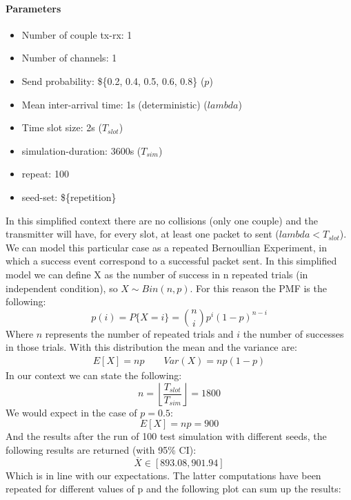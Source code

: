 \paragraph{Parameters}
\begin{itemize}
	\item Number of couple tx-rx: 1
	\item Number of channels: 1
	\item Send probability: \$\{0.2, 0.4, 0.5, 0.6, 0.8\} ($p$)
	\item Mean inter-arrival time: 1s (deterministic) ($lambda$)
	\item Time slot size: 2s ($T_{slot}$)
	\item simulation-duration: 3600s ($T_{sim}$)
	\item repeat: 100
	\item seed-set: \$\{repetition\}
\end{itemize}
In this simplified context there are no collisions (only one couple) and the transmitter will have, for every slot, at least one packet to sent ($lambda < T_{slot}$). We can model this particular case as a repeated Bernoullian Experiment, in which a success event correspond to a successful packet sent. In this simplified model we can define X as the number of success in n repeated trials (in independent condition), so $X \sim Bin(n, p)$. For this reason the PMF is the following:
\begin{equation}
	p(i) = P\{X = i\} = \binom{n}{i} p^{i} (1-p)^{n-i}
\end{equation}
Where $n$ represents the number of repeated trials and $i$ the number of successes in those trials. With this distribution the mean and the variance are:
\begin{align*}
	E[X] = np \qquad     
	Var(X) = np(1-p)
\end{align*}
In our context we can state the following:
\begin{equation}
	n = \left \lfloor{\dfrac{T_{slot}}{T_{sim}}}\right \rfloor = 1800
\end{equation}
We would expect in the case of $p = 0.5$:
\begin{equation}
	E[X] = np = 900
\end{equation}
And the results after the run of 100 test simulation with different seeds, the following results are returned (with 95\% CI):
\begin{equation}
	\overline{X} \in [893.08, 901.94]
\end{equation}
Which is in line with our expectations. The latter computations have been repeated for different values of p and the following plot can sum up the results:

